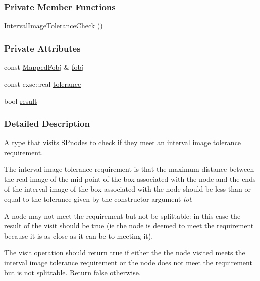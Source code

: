 \subsubsection*{\-Private \-Member \-Functions}
\begin{DoxyCompactItemize}
\item 
\hyperlink{classsubpavings_1_1IntervalImageToleranceCheck_a1d73890a63ae9fb7bc3e20840485bdd9}{\-Interval\-Image\-Tolerance\-Check} ()
\end{DoxyCompactItemize}
\subsubsection*{\-Private \-Attributes}
\begin{DoxyCompactItemize}
\item 
const \hyperlink{classsubpavings_1_1MappedFobj}{\-Mapped\-Fobj} \& \hyperlink{classsubpavings_1_1IntervalImageToleranceCheck_a596c18c976319d44ac404059b89f6226}{fobj}
\item 
const cxsc\-::real \hyperlink{classsubpavings_1_1IntervalImageToleranceCheck_a32e81664f6d68908ac63b89e5b24afa7}{tolerance}
\item 
bool \hyperlink{classsubpavings_1_1IntervalImageToleranceCheck_acde9d9bfcbfc1d39c3546aa3a1772374}{result}
\end{DoxyCompactItemize}


\subsubsection{\-Detailed \-Description}
\-A type that visits  \-S\-Pnodes to check if they meet an interval image tolerance requirement. 

\-The interval image tolerance requirement is that the maximum distance between the real image of the mid point of the box associated with the node and the ends of the interval image of the box associated with the node should be less than or equal to the tolerance given by the constructor argument {\itshape tol\/}.

\-A node may not meet the requirement but not be splittable\-: in this case the result of the visit should be true (ie the node is deemed to meet the requirement because it is as close as it can be to meeting it).

\-The visit operation should return true if either the the node visited meets the interval image tolerance requirement or the node does not meet the requirement but is not splittable. \-Return false otherwise. 

